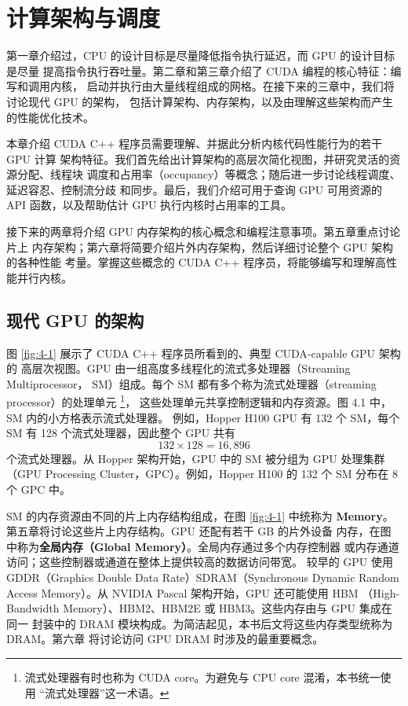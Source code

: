 \chapter{计算架构与调度}
\label{chap:compute-architecture-and-scheduling}
\chaptercontents

\setcounter{footnote}{0}

第一章介绍过，CPU 的设计目标是尽量降低指令执行延迟，而 GPU 的设计目标是尽量
提高指令执行吞吐量。第二章和第三章介绍了 CUDA 编程的核心特征：编写和调用内核，
启动并执行由大量线程组成的网格。在接下来的三章中，我们将讨论现代 GPU 的架构，
包括计算架构、内存架构，以及由理解这些架构而产生的性能优化技术。

本章介绍 CUDA C++ 程序员需要理解、并据此分析内核代码性能行为的若干 GPU 计算
架构特征。我们首先给出计算架构的高层次简化视图，并研究灵活的资源分配、线程块
调度和占用率（occupancy）等概念；随后进一步讨论线程调度、延迟容忍、控制流分歧
和同步。最后，我们介绍可用于查询 GPU 可用资源的 API 函数，以及帮助估计 GPU
执行内核时占用率的工具。

接下来的两章将介绍 GPU 内存架构的核心概念和编程注意事项。第五章重点讨论片上
内存架构；第六章将简要介绍片外内存架构，然后详细讨论整个 GPU 架构的各种性能
考量。掌握这些概念的 CUDA C++ 程序员，将能够编写和理解高性能并行内核。

\section{现代 GPU 的架构}
\label{sec:modern-gpu-architecture}

图 \ref{fig:4-1} 展示了 CUDA C++ 程序员所看到的、典型 CUDA-capable GPU 架构的
高层次视图。GPU 由一组高度多线程化的流式多处理器（Streaming Multiprocessor，
SM）组成。每个 SM 都有多个称为流式处理器（streaming processor）的处理单元
\footnote{流式处理器有时也称为 CUDA core。为避免与 CPU core 混淆，本书统一使用
“流式处理器”这一术语。}，
这些处理单元共享控制逻辑和内存资源。图 4.1 中，SM 内的小方格表示流式处理器。
例如，Hopper H100 GPU 有 132 个 SM，每个 SM 有 128 个流式处理器，因此整个 GPU
共有
\[
  132\times128=16{,}896
\]
个流式处理器。从 Hopper 架构开始，GPU 中的 SM 被分组为 GPU 处理集群（GPU
Processing Cluster，GPC）。例如，Hopper H100 的 132 个 SM 分布在 8 个 GPC 中。

SM 的内存资源由不同的片上内存结构组成，在图 \ref{fig:4-1} 中统称为
\textbf{Memory}。第五章将讨论这些片上内存结构。GPU 还配有若干 GB 的片外设备
内存，在图中称为\textbf{全局内存（Global Memory）}。全局内存通过多个内存控制器
或内存通道访问；这些控制器或通道在整体上提供较高的数据访问带宽。
较早的 GPU 使用 GDDR（Graphics Double Data Rate）SDRAM（Synchronous Dynamic
Random Access Memory）。从 NVIDIA Pascal 架构开始，GPU 还可能使用 HBM
（High-Bandwidth Memory）、HBM2、HBM2E 或 HBM3。这些内存由与 GPU 集成在同一
封装中的 DRAM 模块构成。为简洁起见，本书后文将这些内存类型统称为 DRAM。第六章
将讨论访问 GPU DRAM 时涉及的最重要概念。

